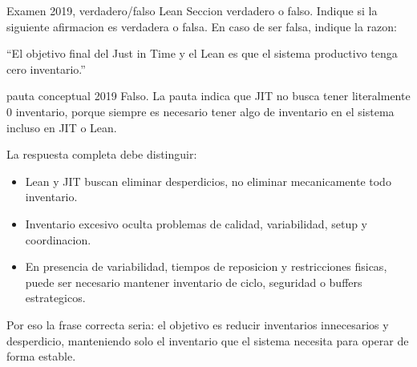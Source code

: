 \begin{enunciado}{Examen 2019, verdadero/falso Lean}
Seccion verdadero o falso. Indique si la siguiente afirmacion es verdadera o falsa. En caso de ser falsa, indique la razon:

``El objetivo final del Just in Time y el Lean es que el sistema productivo tenga cero inventario.''
\end{enunciado}

\begin{pautacompleta}{pauta conceptual 2019}
Falso. La pauta indica que JIT no busca tener literalmente 0 inventario, porque siempre es necesario tener algo de inventario en el sistema incluso en JIT o Lean.

La respuesta completa debe distinguir:
\begin{itemize}
  \item Lean y JIT buscan eliminar desperdicios, no eliminar mecanicamente todo inventario.
  \item Inventario excesivo oculta problemas de calidad, variabilidad, setup y coordinacion.
  \item En presencia de variabilidad, tiempos de reposicion y restricciones fisicas, puede ser necesario mantener inventario de ciclo, seguridad o buffers estrategicos.
\end{itemize}
Por eso la frase correcta seria: el objetivo es reducir inventarios innecesarios y desperdicio, manteniendo solo el inventario que el sistema necesita para operar de forma estable.
\end{pautacompleta}

